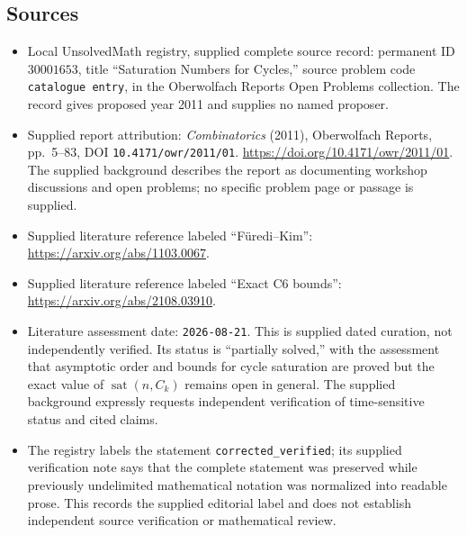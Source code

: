 \documentclass[11pt]{article}
\begin{document}
\subsection{Sources}
\begin{itemize}
\item Local UnsolvedMath registry, supplied complete source record: permanent ID \(30001653\), title ``Saturation Numbers for Cycles,'' source problem code \texttt{catalogue entry}, in the Oberwolfach Reports Open Problems collection. The record gives proposed year 2011 and supplies no named proposer.
\item Supplied report attribution: \emph{Combinatorics} (2011), Oberwolfach Reports, pp.\ 5--83, DOI \texttt{10.4171/owr/2011/01}. \url{https://doi.org/10.4171/owr/2011/01}. The supplied background describes the report as documenting workshop discussions and open problems; no specific problem page or passage is supplied.
\item Supplied literature reference labeled ``Füredi--Kim'': \url{https://arxiv.org/abs/1103.0067}.
\item Supplied literature reference labeled ``Exact C6 bounds'': \url{https://arxiv.org/abs/2108.03910}.
\item Literature assessment date: \texttt{2026-08-21}. This is supplied dated curation, not independently verified. Its status is ``partially solved,'' with the assessment that asymptotic order and bounds for cycle saturation are proved but the exact value of \(\operatorname{sat}(n,C_k)\) remains open in general. The supplied background expressly requests independent verification of time-sensitive status and cited claims.
\item The registry labels the statement \texttt{corrected\_verified}; its supplied verification note says that the complete statement was preserved while previously undelimited mathematical notation was normalized into readable prose. This records the supplied editorial label and does not establish independent source verification or mathematical review.
\end{itemize}
\end{document}
